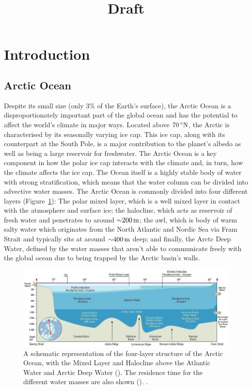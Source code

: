 \documentclass[10pt,a4paper]{article}
\title{Draft}
\begin{document}
\maketitle


\section{Introduction}

\glsresetall

\subsection{Arctic Ocean}
\label{arcticocean}


Despite its small size (only $3\%$ of the Earth's surface), the Arctic
Ocean is a disproportionately important part of the global ocean and has the potential
to affect the world's climate in major ways. Located above
$70\,^{\circ}{\rm N}$, the Arctic is characterised by its seasonally
varying ice cap. This ice cap, along with its counterpart at the South
Pole, is a major contribution to the planet's albedo as well as being
a large reservoir for freshwater. The Arctic Ocean is a key component
in how the polar ice cap interacts with the climate and, in turn, how
the climate affects the ice cap. 
The Ocean itself is a highly stable body of water with strong stratification, 
which means that the water column can be divided into advective water masses.
The Arctic Ocean is commonly divided into four different layers (Figure~\ref{fig:amap}):
The polar mixed layer, which is a well mixed layer in
contact with the atmosphere and surface ice; the halocline, which acts as
reservoir of fresh water and penetrates to around ${\sim}200\,{\rm m}$; the \gls{awl},
which is body of warm salty water which originates from the North Atlantic and Nordic 
Sea via Fram Strait and typically sits at around ${\sim}400\,{\rm m}$ deep; and finally, 
the Arctc Deep Water, defined by the water masses that aren't
able to communicate freely with the global ocean due to being trapped by the Arctic basin's walls.



\begin{figure}
	\centering
	\includegraphics[width=\linewidth]{amap}
	\caption[\cite{wilson1998amap}]{  A schematic representation of the four-layer structure of the Arctic Ocean, with the Mixed Layer and Halocline
		above the Atlantic Water and Arctic Deep Water (\cite{aagaard1989role}). 
		The residence time for the different water masses are also shown (\cite{bonisch1995deep}). \cite{wilson1998amap}.}
	\label{fig:amap}
\end{figure}
\end{document}
